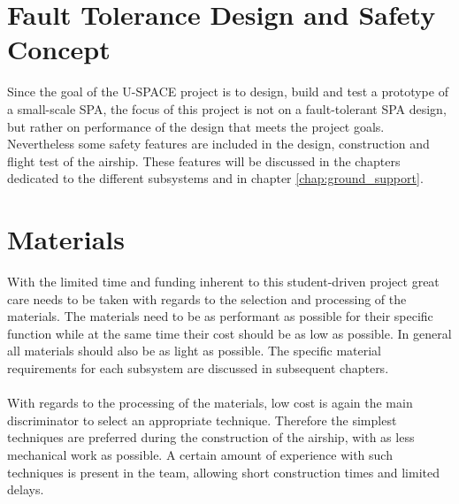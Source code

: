 \section{Fault Tolerance Design and Safety Concept}

Since the goal of the \ac{U-SPACE} project is to design, build and test a prototype of a small-scale \ac{SPA}, the focus of this project is not on a fault-tolerant \ac{SPA} design, but rather on  performance of the design that meets the project goals. Nevertheless some safety features are included in the design, construction and flight test of the airship. These features will be discussed in the chapters dedicated to the different subsystems and in chapter \ref{chap:ground_support}.

\section{Materials}

With the limited time and funding inherent to this student-driven project great care needs to be taken with regards to the selection and processing of the materials. The materials need to be as performant as possible for their specific function while at the same time their cost should be as low as possible. In general all materials should also be as light as possible. The specific material requirements for each subsystem are discussed in subsequent chapters.
\\
\\
With regards to the processing of the materials, low cost is again the main discriminator to select an appropriate technique. Therefore the simplest techniques are preferred during the construction of the airship, with as less mechanical work as possible. A certain amount of experience with such techniques is present in the team, allowing short construction times and limited delays.